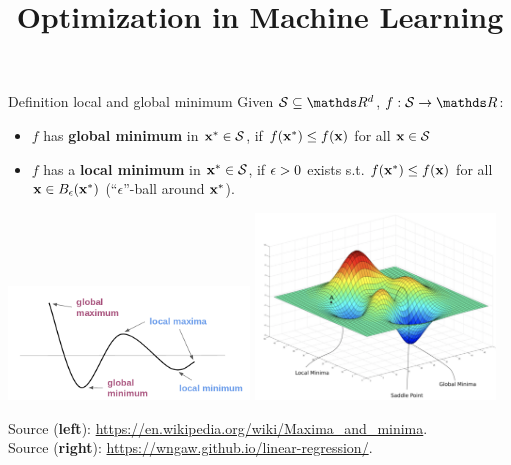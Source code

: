 \documentclass[11pt,compress,t,notes=noshow, xcolor=table]{beamer}
\title{Optimization in Machine Learning}
\date{}
\begin{document}
\sloppy

\begin{vbframe}{Definition local and global minimum}
Given $\mathcal{S} \subseteq \R^d$, $f: \mathcal{S} \to \R$:
\begin{itemize}
    \item $f$ has \textbf{global minimum} in $\mathbf{x}^\ast \in \mathcal{S}$, if $f(\mathbf{x}^\ast) \leq f(\mathbf{x})$ for all $\mathbf{x} \in \mathcal{S}$
    \item $f$ has a \textbf{local minimum} in $\mathbf{x}^\ast\in\mathcal{S}$, if $\epsilon>0$ exists s.t. $f(\mathbf{x}^\ast) \leq f(\mathbf{x})$ for all $\mathbf{x} \in B_\epsilon(\mathbf{x}^\ast)$ (\enquote{$\epsilon$}-ball around $\mathbf{x}^\ast$).
\end{itemize}

\vspace*{-0.3cm}

\begin{center}
    \includegraphics[width = 0.48\textwidth]{figure_man/local_global_min.png} \quad \includegraphics[width = 0.48\textwidth]{figure_man/local_global_min_2D.png} \\
    \vspace*{0.3cm}
    \begin{tiny}
        Source (\textbf{left}): \url{https://en.wikipedia.org/wiki/Maxima_and_minima}. \\
        Source (\textbf{right}): \url{https://wngaw.github.io/linear-regression/}. 
    \end{tiny}
\end{center}

\end{vbframe}
  
\end{document}
